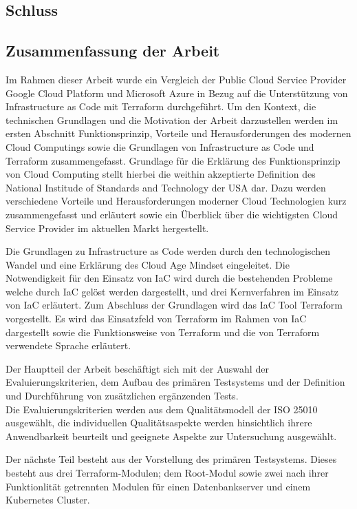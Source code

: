 \begin{spacing}{1.2}

\chapter{Schluss}
\label{sec:schluss}

\section{Zusammenfassung der Arbeit}

Im Rahmen dieser Arbeit wurde ein Vergleich der Public Cloud Service
Provider Google Cloud Platform und Microsoft Azure in Bezug auf die
Unterstützung von Infrastructure as Code mit Terraform durchgeführt.
Um den Kontext, die technischen Grundlagen und die Motivation der Arbeit
darzustellen werden im ersten Abschnitt Funktionsprinzip, Vorteile und
Herausforderungen des modernen Cloud Computings sowie die Grundlagen
von Infrastructure as Code und Terraform zusammengefasst.
Grundlage für die Erklärung des Funktionsprinzip von Cloud Computing
stellt hierbei die weithin akzeptierte Definition des National
Institude of Standards and Technology der USA dar.
Dazu werden verschiedene Vorteile und Herausforderungen moderner Cloud
Technologien kurz zusammengefasst und erläutert sowie ein
Überblick über die wichtigsten Cloud Service Provider im aktuellen
Markt hergestellt.

Die Grundlagen zu Infrastructure as Code werden durch den
technologischen Wandel und eine Erklärung des Cloud Age Mindset
eingeleitet. Die Notwendigkeit für den Einsatz von IaC wird durch
die bestehenden Probleme welche durch IaC gelöst werden dargestellt,
und drei Kernverfahren im Einsatz von IaC erläutert.
Zum Abschluss der Grundlagen wird das IaC Tool Terraform vorgestellt.
Es wird das Einsatzfeld von Terraform im Rahmen von IaC dargestellt
sowie die Funktionsweise von Terraform und die von Terraform
verwendete Sprache erläutert.

Der Hauptteil der Arbeit beschäftigt sich mit der Auswahl der 
Evaluierungskriterien, dem Aufbau des primären Testsystems und
der Definition und Durchführung von zusätzlichen ergänzenden Tests.\\
Die Evaluierungskriterien werden aus dem Qualitätsmodell der ISO
25010 ausgewählt, die individuellen Qualitätsaspekte werden hinsichtlich
ihrere Anwendbarkeit beurteilt und geeignete Aspekte zur Untersuchung
ausgewählt.

Der nächste Teil besteht aus der Vorstellung des primären Testsystems.
Dieses besteht aus drei Terraform-Modulen; dem Root-Modul sowie
zwei nach ihrer Funktionlität getrennten Modulen für einen 
Datenbankserver und einem Kubernetes Cluster.


\end{spacing}
